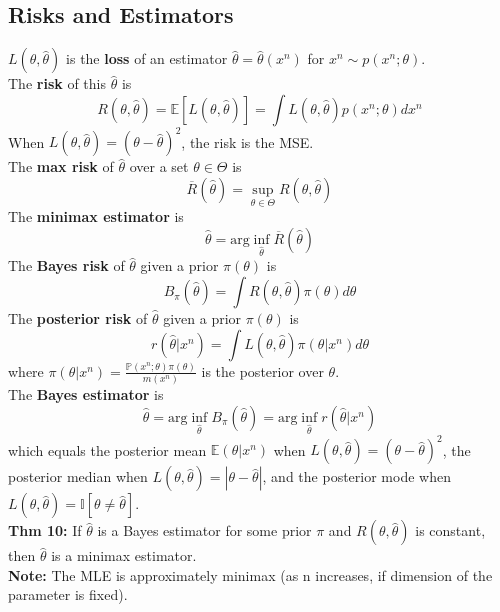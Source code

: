 \documentclass[10pt,twocolumn]{article}
\begin{document}
\subsection*{Risks and Estimators}
$L(\theta,\hat{\theta})$ is the \textbf{loss} of an estimator $\hat{\theta} = \hat{\theta}(x^{n})$ for $x^{n} \sim p(x^{n};\theta)$.\\
The \textbf{risk} of this $\hat{\theta}$ is
\begin{equation}
    R(\theta,\hat{\theta}) = \mathbb{E}[L(\theta,\hat{\theta})] = \int L(\theta,\hat{\theta}) p(x^{n};\theta) dx^{n}
\end{equation}
When $L(\theta,\hat{\theta}) = (\theta-\hat{\theta})^{2}$, the risk is the MSE.\\
The \textbf{max risk} of $\hat{\theta}$ over a set $\theta \in \Theta$ is
\begin{equation}
    \overline{R}(\hat{\theta}) = \sup_{\theta \in \Theta} R(\theta,\hat{\theta})
\end{equation}
The \textbf{minimax estimator} is
\begin{equation}
    \hat{\theta} = \text{arg}\inf_{\hat{\theta}} \overline{R}(\hat{\theta})
\end{equation}
The \textbf{Bayes risk} of $\hat{\theta}$ given a prior $\pi(\theta)$ is
\begin{equation}
    B_{\pi}(\hat{\theta}) = \int R(\theta,\hat{\theta}) \pi(\theta) d\theta
\end{equation}
The \textbf{posterior risk} of $\hat{\theta}$ given a prior $\pi(\theta)$ is
\begin{equation}
    r(\hat{\theta}|x^{n}) = \int L(\theta,\hat{\theta}) \pi(\theta|x^{n}) d\theta    
\end{equation}
where $\pi(\theta|x^{n}) = \frac{\mathbb{P}(x^{n};\theta)\pi(\theta)}{m(x^{n})}$ is the posterior over $\theta$.\\
The \textbf{Bayes estimator} is
\begin{equation}
    \hat{\theta} = \text{arg}\inf_{\hat{\theta}} B_{\pi}(\hat{\theta}) = \text{arg}\inf_{\hat{\theta}} r(\hat{\theta}|x^{n})
\end{equation}
which equals the posterior mean $\mathbb{E}(\theta|x^{n})$ when $L(\theta,\hat{\theta}) = (\theta-\hat{\theta})^{2}$, the posterior median when $L(\theta,\hat{\theta}) = |\theta-\hat{\theta}|$, and the posterior mode when $L(\theta,\hat{\theta}) = \mathbb{I}[\theta \neq \hat{\theta}]$.\\
\textbf{Thm 10:} If $\hat{\theta}$ is a Bayes estimator for some prior $\pi$ and $R(\theta,\hat{\theta})$ is constant, then $\hat{\theta}$ is a minimax estimator.\\
\textbf{Note:} The MLE is approximately minimax (as n increases, if dimension of the parameter is fixed).
\end{document}
